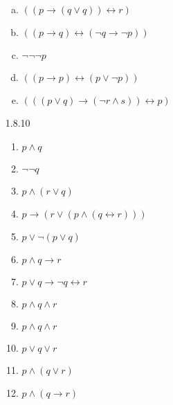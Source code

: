 \begin{enumerate}
\begin{enumerate}[(a)]
\item $((p\to (q\lor q))\leftrightarrow r)$



\item $((p\to q)\leftrightarrow (\neg q\to \neg p))$



\item $\neg\neg\neg p$



\item $(({p} \to {p}) \leftrightarrow ({p}\lor \neg {p}))$


\item $(((p\lor q)\to (\neg r\land s))\leftrightarrow {p})$

		
		\end{enumerate}
		
		\item[1.8.10] \
		
		\begin{enumerate}
		
			\item $p\land q$
		
			\item $\neg\neg q$
			
			\item $p\land (r\lor q)$
			
			\item $p\to (r\lor (p\land (q\leftrightarrow r)))$
			
			\item $p\lor \neg (p\lor q)$
			
			\item $p\land q\to r$
			
			\item $p\lor q\to \neg q\leftrightarrow r$
			
			\item $p\land q\land r$
			
			\item $p\land q\land r$
			
			\item $p\lor q\lor r$
			
			\item $p\land (q\lor r)$
			
			\item $p\land (q\to r)$
				
		\end{enumerate}
		
\end{enumerate}
	
